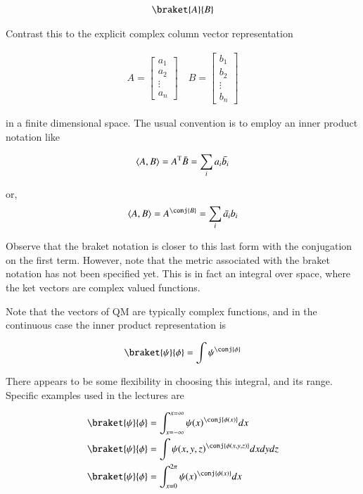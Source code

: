 \begin{align*}
\braket{A}{B}
\end{align*}

Contrast this to the explicit complex column vector representation

\begin{align*}
{A} = 
\begin{bmatrix}
a_1 \\
a_2 \\
\vdots \\
a_n
\end{bmatrix}
\quad
{B} = 
\begin{bmatrix}
b_1 \\
b_2 \\
\vdots \\
b_n
\end{bmatrix}
\end{align*}

in a finite dimensional space.  The usual convention is to employ an inner product notation like

\begin{align*}
\langle{A}, {B}\rangle = {A}^\text{T} \bar{B} = \sum_i {a_i} \bar{b_i}
\end{align*}

or,
\begin{align*}
\innerprod{A}{B} = {A}^\conj {B} = \sum_i \bar{a_i} {b_i}
\end{align*}

Observe that the braket notation is closer to this last form with the conjugation on the first term.  However, note that the metric associated with the braket notation has not been specified yet.  This is in fact an integral over space, where the ket vectors are complex valued functions.

Note that the vectors of QM are typically complex functions, and in the continuous case the inner product representation is

\begin{align*}
\braket{\psi}{\phi} = \int {\psi}^\conj {\phi}
\end{align*}

There appears to be some flexibility in choosing this integral, and its range.  Specific examples used in the lectures are

\begin{align*}
\braket{\psi}{\phi} &= \int_{x=-\infty}^{x=\infty} {\psi(x)}^\conj {\phi(x)} dx \\
\braket{\psi}{\phi} &= \int {\psi(x,y,z)}^\conj {\phi(x,y,z)} dx dy dz \\
\braket{\psi}{\phi} &= \int_{x=0}^{2\pi} {\psi(x)}^\conj {\phi(x)} dx \\
\end{align*}

